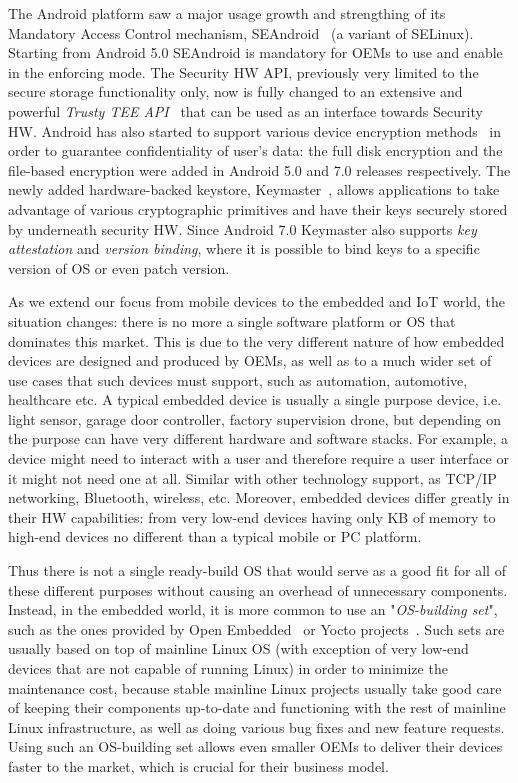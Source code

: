 The Android platform saw a major usage growth and strengthing of its Mandatory Access Control mechanism, SEAndroid~\cite{smalley12} (a variant of SELinux). Starting from Android 5.0 SEAndroid is mandatory for OEMs to use and enable in the enforcing mode. The Security HW API, previously very limited to the secure storage functionality only, now is fully changed to an extensive and powerful \textit{Trusty TEE API}~\cite{trusty} that can be used as an interface towards Security HW. Android has also started to support various device encryption methods~\cite{androidencr} in order to guarantee confidentiality of user's data: the full disk encryption and the file-based encryption were added in Android 5.0 and 7.0 releases respectively. The newly added hardware-backed keystore, Keymaster~\cite{androidkeymaster}, allows applications to take advantage of various cryptographic primitives and have their keys securely stored by underneath security HW. Since Android 7.0 Keymaster also supports \textit{key attestation} and \textit{version binding}, where it is possible to bind keys to a specific version of OS or even patch version. 


As we extend our focus from mobile devices to the embedded and IoT world, the situation changes: there is no more a single software platform or OS that dominates this market. This is due to the very different nature of how embedded devices are designed and produced by OEMs, as well as to a much wider set of use cases that such devices must support, such as automation, automotive, healthcare etc. A typical embedded device is usually a single purpose device, i.e. light sensor, garage door controller, factory supervision drone, but depending on the purpose can have very different hardware and software stacks. For example, a device might need to interact with a user and therefore require a user interface or it might not need one at all. Similar with other technology support, as TCP/IP networking, Bluetooth, wireless, etc. Moreover, embedded devices differ greatly in their HW capabilities: from very low-end devices having only KB of memory to high-end devices no different than a typical mobile or PC platform.

Thus there is not a single ready-build OS that would serve as a good fit for all of these different purposes without causing an overhead of unnecessary components. Instead, in the embedded world, it is more common to use an "\textit{OS-building set}", such as the ones provided by Open Embedded~\cite{OE2017} or Yocto projects~\cite{yocto2017}. Such sets are usually based on top of mainline Linux OS (with exception of very low-end devices that are not capable of running Linux) in order to minimize the maintenance cost, because stable mainline Linux projects usually take good care of keeping their components up-to-date and functioning with the rest of mainline Linux infrastructure, as well as doing various bug fixes and new feature requests. Using such an OS-building set allows even smaller OEMs to deliver their devices faster to the market, which is crucial for their business model.

